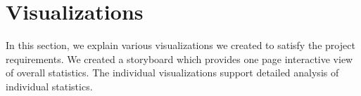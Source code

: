 \section{Visualizations} \label{viz}
In this section, we explain various visualizations we created to satisfy the
project requirements. We created a storyboard which provides one page
interactive view of overall statistics. The individual visualizations
support detailed analysis of individual statistics.

